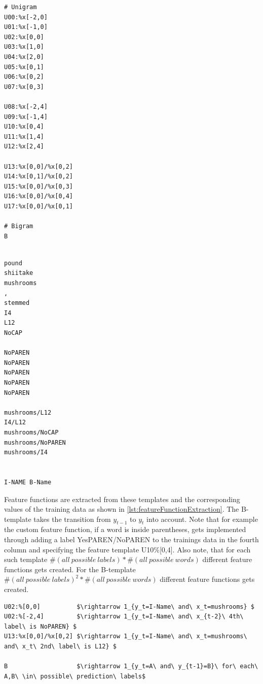 \documentclass[12pt, twoside]{report}
\begin{document}
\newpage
\begin{minipage}{0.4\textwidth} 
\begin{lstlisting}[frame=single, caption={Feature templates for New York Times CRF}, label=lst:NYTfeatureTemplates]
# Unigram               
U00:%x[-2,0]             
U01:%x[-1,0]              
U02:%x[0,0]
U03:%x[1,0]
U04:%x[2,0]
U05:%x[0,1]
U06:%x[0,2]
U07:%x[0,3]

U08:%x[-2,4]
U09:%x[-1,4]
U10:%x[0,4]
U11:%x[1,4]
U12:%x[2,4]

U13:%x[0,0]/%x[0,2]
U14:%x[0,1]/%x[0,2]
U15:%x[0,0]/%x[0,3]
U16:%x[0,0]/%x[0,4]
U17:%x[0,0]/%x[0,1]

# Bigram
B
\end{lstlisting}
\end{minipage}
\hfill
\begin{minipage}{0.5\textwidth} 
\begin{lstlisting}[frame=single, caption={Derived values when the current word in \cref{lst:NYTTrainingData} is mushrooms}, label=lst:NYTfeatureTemplatesDerivedValue]
            
pound            
shiitake            
mushrooms
,
stemmed
I4
L12
NoCAP

NoPAREN
NoPAREN
NoPAREN
NoPAREN
NoPAREN

mushrooms/L12
I4/L12
mushrooms/NoCAP
mushrooms/NoPAREN
mushrooms/I4


I-NAME B-Name
\end{lstlisting}
\end{minipage}

Feature functions are extracted from these templates and the corresponding values of the training data as shown in \cref{lst:featureFunctionExtraction}. The B-template takes the transition from $y_{t-1}$ to $y_t$ into account. Note that for example the custom feature function, if a word is inside parentheses, gets implemented through adding a label YesPAREN/NoPAREN to the trainings data in the fourth column and specifying the feature template U10\%[0,4]. Also note, that for each such template $\#(all\ possible\ labels)*\#(all\ possible\ words)$ different feature functions gets created. For the B-template $\#(all\ possible\ labels)^2*\#(all\ possible\ words)$ different feature functions gets created.

\begin{lstlisting}[frame=single, caption={Extracting of feature functions from templates}, label=lst:featureFunctionExtraction, mathescape]
U02:%[0,0]          $\rightarrow 1_{y_t=I-Name\ and\ x_t=mushrooms} $
U02:%[-2,4]         $\rightarrow 1_{y_t=I-Name\ and\ x_{t-2}\ 4th\ label\ is NoPAREN} $
U13:%x[0,0]/%x[0,2] $\rightarrow 1_{y_t=I-Name\ and\ x_t=mushrooms\ and\ x_t\ 2nd\ label\ is L12} $

B                   $\rightarrow 1_{y_t=A\ and\ y_{t-1}=B}\ for\ each\ A,B\ \in\ possible\ prediction\ labels$
\end{lstlisting}
\end{document}
